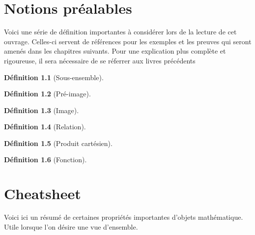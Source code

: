 \documentclass[12pt]{book}
\theoremstyle{definition}
\newtheorem{definition}{Définition}[section]
\begin{document}
\chapter{Notions préalables}
Voici une série de définition importantes à considérer lors de la lecture de cet ouvrage. Celles-ci servent
de références pour les exemples et les preuves qui seront amenés dans les chapitres suivants. Pour une explication
plus complète et rigoureuse, il sera nécessaire de se réferrer aux livres précédents

\begin{definition}[Sous-ensemble]
    \label{def:sous_ensemble}
\end{definition}

\begin{definition}[Pré-image]
    \label{def:pre_image}
\end{definition}

\begin{definition}[Image]
    \label{def:image}
\end{definition}

\begin{definition}[Relation]
    \label{def:relation}
\end{definition}

\begin{definition}[Produit cartésien]
    \label{def:produit_cartesien}
\end{definition}

\begin{definition}[Fonction]
    \label{def:fonction}
\end{definition}


\chapter{Cheatsheet}
Voici ici un résumé de certaines propriétés importantes d'objets mathématique. Utile lorsque l'on désire une vue d'ensemble.
\end{document}
